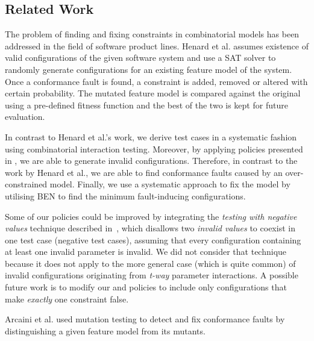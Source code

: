 \begin{tikzborder}{\cite{Gargantini16:validation}}
\begin{tikzborder}{\cite{gargantini_combinatorial_2017}}
\begin{tikzborder}{\cite{gargantini_combinatorial_2017}}
\begin{figure}[h]
\end{figure}



\subsection{Related Work}
\label{sec:constr_relatedwork}

\bb The problem of finding and fixing constraints in combinatorial models has been addressed in the field of software product lines. Henard et al. \cite{henard_towards_2013} assumes existence of valid configurations of the given software system and use a SAT solver to randomly generate configurations for an existing feature model of the system. Once a conformance fault is found, a constraint is added, removed or altered with certain probability. The mutated feature model is compared against the original using a pre-defined fitness function and the best of the two is kept for future evaluation. 

In contrast to Henard et al.'s work, we derive test cases in a systematic fashion using combinatorial interaction testing. Moreover, by applying policies presented in \cite{Gargantini16:validation}, we are able to generate invalid configurations. Therefore, in contrast to the work by Henard et al., we are able to find conformance faults caused by an over-constrained model. Finally, we use a systematic approach to fix the model by utilising BEN to find the minimum fault-inducing configurations.

Some of our policies could be improved by integrating the \emph{testing with negative values} technique described in~\cite{czerwonka2006pairwise}, which disallows two \emph{invalid values} to coexist in one test case (negative test cases), assuming that every configuration containing at least one invalid parameter is invalid. We did not consider that technique because it does not apply to the more general case (which is quite common) of invalid configurations originating from \emph{t-way} parameter interactions. A possible future work is to modify our \cv and \ValC policies to include only configurations that make \emph{exactly} one constraint false.

Arcaini et al. \cite{icst2016} used mutation testing to detect and fix conformance faults by distinguishing a given feature model from its mutants. \be



\end{tikzborder}
\end{tikzborder}
\end{tikzborder}

